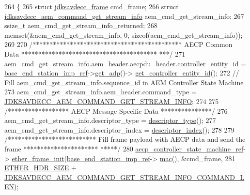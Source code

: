 \begin{DoxyCode}
264 \{
265     \textcolor{keyword}{struct }\hyperlink{structjdksavdecc__frame}{jdksavdecc\_frame} cmd\_frame;
266     \textcolor{keyword}{struct }\hyperlink{structjdksavdecc__aem__command__get__stream__info}{jdksavdecc\_aem\_command\_get\_stream\_info} 
      aem\_cmd\_get\_stream\_info;
267     ssize\_t aem\_cmd\_get\_stream\_info\_returned;
268     memset(&aem\_cmd\_get\_stream\_info, 0, \textcolor{keyword}{sizeof}(aem\_cmd\_get\_stream\_info));
269 
270     \textcolor{comment}{/******************************************** AECP Common Data ****************************************
      ***/}
271     aem\_cmd\_get\_stream\_info.aem\_header.aecpdu\_header.controller\_entity\_id = 
      \hyperlink{classavdecc__lib_1_1descriptor__base__imp_a550c969411f5f3b69f55cc139763d224}{base\_end\_station\_imp\_ref}->\hyperlink{classavdecc__lib_1_1end__station__imp_a471a74540ce6182fad0c17dfd010107e}{get\_adp}()->
      \hyperlink{classavdecc__lib_1_1adp_a0c0959a46658c0a22e9530334b2912da}{get\_controller\_entity\_id}();
272     \textcolor{comment}{// Fill aem\_cmd\_get\_stream\_info.sequence\_id in AEM Controller State Machine}
273     aem\_cmd\_get\_stream\_info.aem\_header.command\_type = 
      \hyperlink{group__command_ga24ecb3f0fabecfdd85f217f77279d2ea}{JDKSAVDECC\_AEM\_COMMAND\_GET\_STREAM\_INFO};
274 
275     \textcolor{comment}{/****************** AECP Message Specific Data ***************/}
276     aem\_cmd\_get\_stream\_info.descriptor\_type = \hyperlink{classavdecc__lib_1_1descriptor__base__imp_aefc543029ab093823c3f5b9d84f0ccc4}{descriptor\_type}();
277     aem\_cmd\_get\_stream\_info.descriptor\_index = \hyperlink{classavdecc__lib_1_1descriptor__base__imp_ac23c0a35276c07cfce8c8660700c2135}{descriptor\_index}();
278 
279     \textcolor{comment}{/************************** Fill frame payload with AECP data and send the frame **********************
      *****/}
280     \hyperlink{namespaceavdecc__lib_a0b1b5aea3c0490f77cbfd9178af5be22}{aecp\_controller\_state\_machine\_ref}->
      \hyperlink{classavdecc__lib_1_1aecp__controller__state__machine_a86ff947c5e6b799cfb877d3767bfa1f9}{ether\_frame\_init}(\hyperlink{classavdecc__lib_1_1descriptor__base__imp_a550c969411f5f3b69f55cc139763d224}{base\_end\_station\_imp\_ref}->
      \hyperlink{classavdecc__lib_1_1end__station__imp_a08e1bd1861b3b8f447ea374a65ac11f9}{mac}(), &cmd\_frame,
281                                                         \hyperlink{namespaceavdecc__lib_a6c827b1a0d973e18119c5e3da518e65ca9512ad9b34302ba7048d88197e0a2dc0}{ETHER\_HDR\_SIZE} + 
      \hyperlink{group__command__get__stream__info_gaae48a0ac802bc8fdeaacfa15f4679e2a}{JDKSAVDECC\_AEM\_COMMAND\_GET\_STREAM\_INFO\_COMMAND\_LEN});

\end{DoxyCode}
